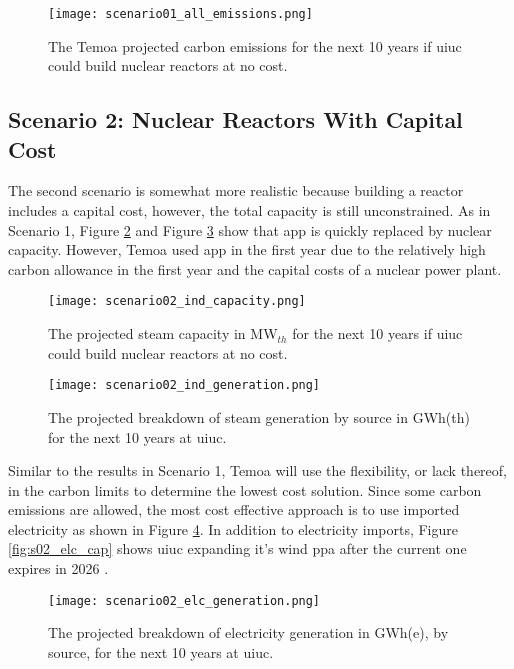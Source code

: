 \begin{figure}[ht!]
	\centering
	\texttt{[image: scenario01\_all\_emissions.png]}
	\caption{The Temoa projected carbon emissions for the next 10 years if
	\gls{uiuc} could build nuclear reactors at no cost.}
	\label{fig:s01_all_co2}
\end{figure}


\subsection{Scenario 2: Nuclear Reactors With Capital Cost}

The second scenario is somewhat more realistic because building a reactor
includes a capital cost, however, the total capacity is still unconstrained.
As in Scenario 1, Figure \ref{fig:s02_ind_cap} and Figure \ref{fig:s02_ind_gen}
show that \gls{app} is quickly replaced by nuclear capacity. However, Temoa
used \gls{app} in the first year due to the relatively high carbon allowance in
the first year and the capital costs of a nuclear power plant.

\begin{figure}[ht!]
	\centering
	\texttt{[image: scenario02\_ind\_capacity.png]}
	\caption{The projected steam capacity in MW$_{th}$ for the next 10 years
	if \gls{uiuc} could build nuclear reactors at no cost.}
	\label{fig:s02_ind_cap}
\end{figure}

\begin{figure}[ht!]
	\centering
	\texttt{[image: scenario02\_ind\_generation.png]}
	\caption{The projected breakdown of steam generation by source in GWh(th)
	for the next 10 years at \gls{uiuc}.}
	\label{fig:s02_ind_gen}
\end{figure}

Similar to the results in Scenario 1, Temoa will use the flexibility, or lack
thereof, in the carbon limits to determine the lowest cost solution. Since some
carbon emissions are allowed, the most cost effective approach is to use
imported electricity as shown in Figure \ref{fig:s02_elc_gen}. In addition to
electricity imports, Figure \ref{fig:s02_elc_cap} shows \gls{uiuc} expanding
it's wind \gls{ppa} after the current one expires in 2026
\cite{breitweiser_wind_2016}.

\begin{figure}[ht!]
	\centering
	\texttt{[image: scenario02\_elc\_generation.png]}
	\caption{The projected breakdown of electricity generation in GWh(e), by
	source, for the next 10 years at \gls{uiuc}.}
	\label{fig:s02_elc_gen}
\end{figure}

